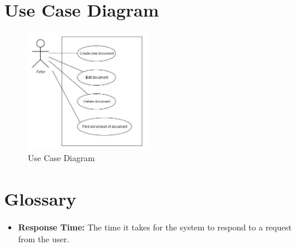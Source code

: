 \documentclass[11pt,a4paper]{article}
\begin{document}
\section{Use Case Diagram}
	\begin{figure}[h!]
  		\centering
    	\includegraphics[width=200px]{images/UseCaseDiagram.jpg}
    	\caption{Use Case Diagram}
	\end{figure}

\section{Glossary}
\begin{itemize}
\item \textbf{Response Time:} The time it takes for the system to respond to a request from the user.
\end{itemize}
\end{document}
